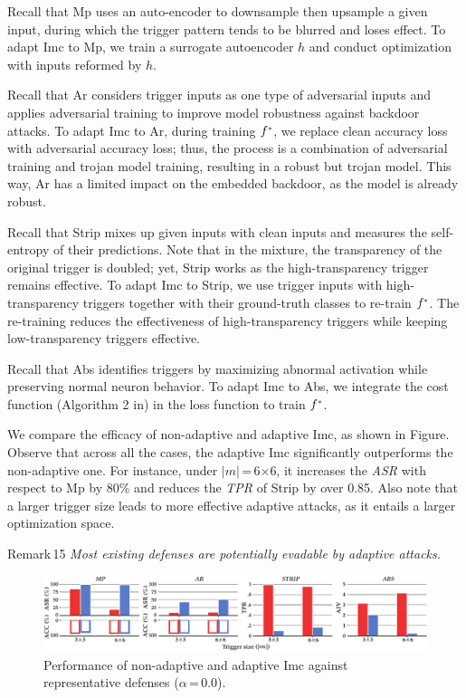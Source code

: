 \documentclass[compsoc,conference,a4paper,10pt,times]{IEEEtran}
\newcommand{\imc}{{\sc Imc}\xspace}
\newcommand{\asr}{{\em \small ASR}\xspace}
\newcommand{\tpr}{{\em \small TPR}\xspace}
\newcommand{\abs}{{\sc Abs}\xspace}
\newcommand{\strip}{{\sc Strip}\xspace}
\newcommand{\at}{{\sc Ar}\xspace}
\newcommand{\mmp}{{\sc Mp}\xspace}
\begin{document}
Recall that \mmp uses an auto-encoder to downsample then upsample a given input, during which the trigger pattern tends to be blurred and loses effect. To adapt \imc to \mmp, we train a surrogate autoencoder $h$ and conduct optimization with  inputs reformed by $h$. 

Recall that \at considers trigger inputs as one type of adversarial inputs and applies adversarial training to improve model robustness against backdoor attacks. To adapt \imc to \at, during training $\uf$, we replace clean accuracy loss with adversarial accuracy loss; thus, the process is a combination of adversarial training and trojan model training, resulting in a robust but trojan model. This way, \at has a limited impact on the embedded backdoor, as the model is already robust.

Recall that \strip mixes up given inputs with clean inputs and measures the self-entropy of their predictions. Note that in the mixture, the transparency of the original trigger is doubled; yet, \strip works as the high-transparency trigger remains effective. To adapt \imc to \strip, we use trigger inputs with high-transparency triggers together with their ground-truth classes to re-train $\uf$. The re-training reduces the effectiveness of high-transparency triggers while keeping low-transparency triggers effective. 

Recall that \abs identifies triggers by maximizing abnormal activation while preserving normal neuron behavior. To adapt \imc to \abs, we integrate the cost function (Algorithm 2 in) in the loss function to train $\uf$.

We compare the efficacy of non-adaptive and adaptive \imc, as shown in Figure. Observe that across all the cases, the adaptive \imc significantly outperforms the non-adaptive one. For instance, under $|m|$\,=\,6$\times$6, it increases the \asr with respect to \mmp by 80\% and reduces the \tpr of \strip by over 0.85. Also note that a larger trigger size leads to more effective adaptive attacks, as it entails a larger optimization space.
\begin{mtbox}{\small Remark\,15}
    {\em \small Most existing defenses are potentially evadable by adaptive attacks.}
\end{mtbox}


\begin{figure}[!ht]
    \centering
    \includegraphics[width=170mm]{figures/adaptation.pdf}
    \caption{Performance of non-adaptive and adaptive \imc against representative defenses ($\alpha$\,=\,0.0). \label{fig:adaptation}}
\end{figure}
\end{document}

